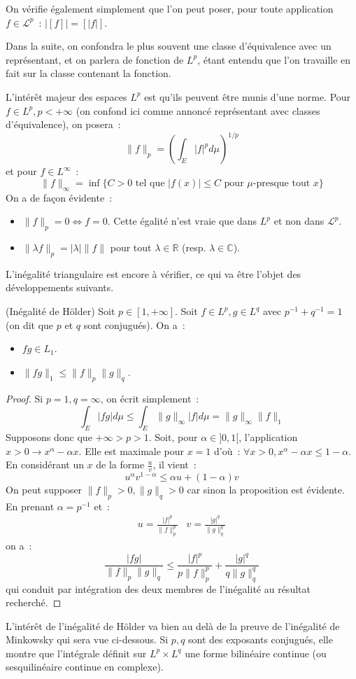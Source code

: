 On vérifie également simplement que l'on peut poser, pour toute
application $f \in \mathcal{L}^p$~: $|[f]| = [|f|]$.

Dans la suite, on confondra le plus souvent une classe d'équivalence
avec un représentant, et on parlera de fonction de $L^p$, étant entendu que l'on
travaille en fait sur la classe contenant la fonction.

L'intérêt majeur des espaces $L^p$ est qu'ils peuvent être munis d'une norme.
Pour $f \in L^p, p < +\infty$ (on confond ici comme annoncé représentant avec classes d'équivalence), on posera~:
\[
\| f\|_p = \left ( \int_E |f|^p d \mu \right )^{1/p}
\]
et pour $f\in L^\infty$~:
\[
\|f\|_\infty = \inf \{ C > 0 \text{ tel que } |f(x)| \leq C \mbox{ pour } \mu
\mbox{-presque tout } x \}
\]
On a de façon évidente~:
\begin{itemize}
\item $\|f\|_p = 0 \Leftrightarrow f = 0$. Cette égalité n'est vraie que dans $L^p$ et non dans $\mathcal{L}^p$.
\item $\| \lambda f \|_p = |\lambda| \| f \|$ pour tout $\lambda \in \mathbb{R}$ (resp. $\lambda \in \mathbb{C}$).
\end{itemize}
L'inégalité triangulaire est encore à vérifier, ce qui va être l'objet des développements suivants.
\begin{mandatory}
\begin{theorem}{(Inégalité de Hölder)}
Soit $p \in[1, +\infty]$. Soit $f \in L^p, g\in L^q$ avec $p^{-1}+q^{-1} = 1$ (on dit que $p$ et $q$ sont conjugués). On a~:
\begin{itemize}
\item $fg \in L_1$.
\item $\|fg\|_1 \leq \|f\|_p \|g\|_q$.
\end{itemize}
\end{theorem}
\end{mandatory}
\begin{proof}
Si $p=1, q=\infty$, on écrit simplement~:
\[
\int_E |fg|d \mu \leq \int_E \|g\|_\infty |f| d \mu = \|g\|_\infty \|f\|_1
\]
Supposons donc que $+\infty > p > 1$.
Soit, pour $\alpha \in ]0,1[$, l'application $x>0 \to x^\alpha -
    \alpha x$. Elle est maximale pour $x=1$ d'où~: $\forall x > 0 ,
    x^\alpha - \alpha x \leq 1 - \alpha$.  En considérant un $x$ de la
    forme $\frac{u}{v}$, il vient~:
\[
u^\alpha v^{1-\alpha} \leq \alpha u +(1-\alpha)v
\]
On peut supposer $\|f\|_p>0, \|g\|_q> 0$ car sinon la proposition est évidente.
En prenant $\alpha = p^{-1}$ et~:
\[
\begin{array}{cc}
u = \frac{|f|^p}{\|f\|_p^p} & v = \frac{|g|^q}{\|g\|_q^q}
\end{array}
\]
on a~:
\[
\frac{|fg|}{\|f\|_p\|g\|_q} \leq \frac{|f|^p}{p \|f\|_p^p} +
\frac{|g|^q}{q \|g\|_q^q}
\]
qui conduit par intégration des deux membres de l'inégalité au
résultat recherché.
\end{proof}
L'intérêt de l'inégalité de Hölder va bien au delà de la preuve de l'inégalité
de Minkowsky qui sera vue ci-dessous. Si $p,q$ sont des exposants conjugués,
elle montre que l'intégrale définit sur $L^p \times L^q$ une forme bilinéaire
continue (ou sesquilinéaire continue en complexe).

